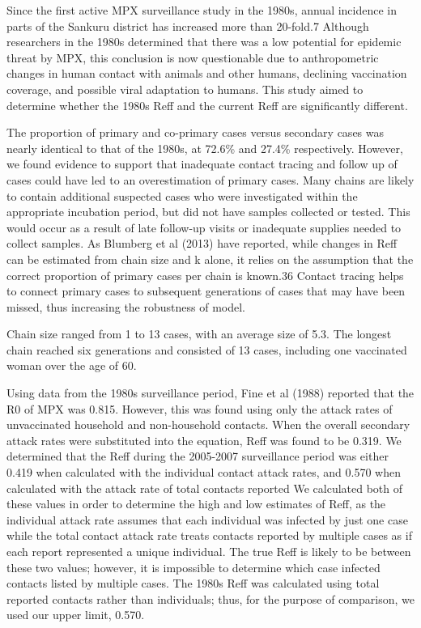 Since the first active MPX surveillance study in the 1980s, annual incidence in parts of the Sankuru district has increased more than 20-fold.7 Although researchers in the 1980s determined that there was a low potential for epidemic threat by MPX, this conclusion is now questionable due to anthropometric changes in human contact with animals and other humans, declining vaccination coverage, and possible viral adaptation to humans. This study aimed to determine whether the 1980s Reff and the current Reff are significantly different.

The proportion of primary and co-primary cases versus secondary cases was nearly identical to that of the 1980s, at 72.6\% and 27.4\% respectively. However, we found evidence to support that inadequate contact tracing and follow up of cases could have led to an overestimation of primary cases. Many chains are likely to contain additional suspected cases who were investigated within the appropriate incubation period, but did not have samples collected or tested. This would occur as a result of late follow-up visits or inadequate supplies needed to collect samples. As Blumberg et al (2013) have reported, while changes in Reff can be estimated from chain size and k alone, it relies on the assumption that the correct proportion of primary cases per chain is known.36 Contact tracing helps to connect primary cases to subsequent generations of cases that may have been missed, thus increasing the robustness of model. 

Chain size ranged from 1 to 13 cases, with an average size of 5.3. The longest chain reached six generations and consisted of 13 cases, including one vaccinated woman over the age of 60.

Using data from the 1980s surveillance period, Fine et al (1988) reported that the R0 of MPX was 0.815. However, this was found using only the attack rates of unvaccinated household and non-household contacts. When the overall secondary attack rates were substituted into the equation, Reff was found to be 0.319. We determined that the Reff during the 2005-2007 surveillance period was either 0.419 when calculated with the individual contact attack rates, and 0.570 when calculated with the attack rate of total contacts reported We calculated both of these values in order to determine the high and low estimates of Reff, as the individual attack rate assumes that each individual was infected by just one case while the total contact attack rate treats contacts reported by multiple cases as if each report represented a unique individual. The true Reff is likely to be between these two values; however, it is impossible to determine which case infected contacts listed by multiple cases. The 1980s Reff was calculated using total reported contacts rather than individuals; thus, for the purpose of comparison, we used our upper limit, 0.570. 

